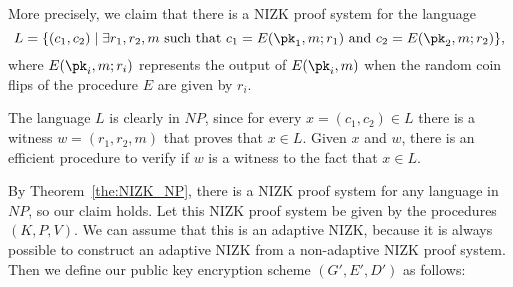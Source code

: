     More precisely, we claim that there is a NIZK proof system for the language
    $$L = \{(c_1,c_2) \mid \text{$\exists r_1,r_2,m$ such that $c_1=E(\pk_1,m;r_1)$ and
            $c_2=E(\pk_2,m;r_2)$}\},$$
    where $E(\pk_i,m;r_i)$ represents the output of $E(\pk_i,m)$ when the random coin flips
    of the procedure $E$ are given by $r_i$.

    The language $L$ is clearly in $NP$, since for every $x=(c_1,c_2)\in L$ there is a witness
    $w=(r_1,r_2,m)$ that proves that $x\in L$. Given $x$ and $w$, there is an efficient procedure
    to verify if $w$ is a witness to the fact that $x\in L$.

    By Theorem~\ref{the:NIZK_NP}, there is a NIZK proof system for any language in $NP$, so our
    claim holds.
    Let this NIZK proof system be given by the procedures $(K,P,V)$.
    We can assume that this is an adaptive NIZK, because it is always possible to construct an
    adaptive NIZK from a non-adaptive NIZK proof system.
    Then we define our public key encryption scheme $(G',E',D')$ as follows:


